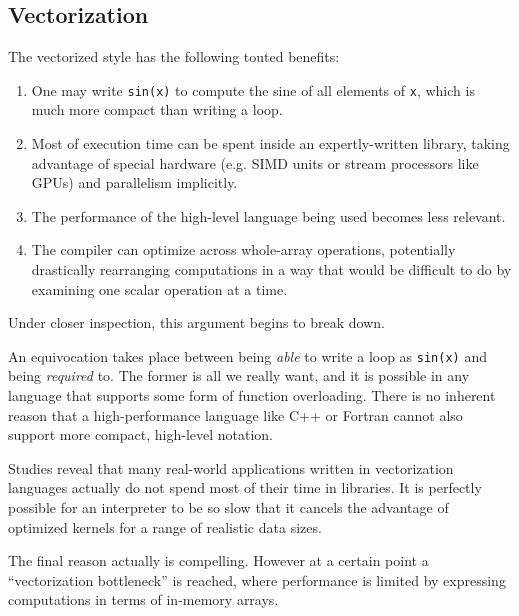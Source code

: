 {%

\subsection{Vectorization}

The vectorized style has the following touted benefits:

\begin{enumerate}
\item One may write \texttt{sin(x)} to compute the sine of
all elements of \texttt{x}, which is much more compact than writing a loop.
\item Most of execution time can be spent inside an expertly-written library,
taking advantage of special hardware (e.g. SIMD units or stream processors
like GPUs) and parallelism implicitly.
\item The performance of the high-level language being used becomes less
relevant.
\item The compiler can optimize across whole-array operations, potentially
drastically rearranging computations in a way that would be difficult to do
by examining one scalar operation at a time.
\end{enumerate}

Under closer inspection, this argument begins to break down.

An equivocation takes place between being \emph{able} to write a loop
as \texttt{sin(x)} and being \emph{required} to.
The former is all we really want, and it is possible in any language that
supports some form of function overloading.
There is no inherent reason that a high-performance language like C++ or
Fortran cannot also support more compact, high-level notation.

Studies reveal that many real-world applications written in vectorization
languages actually do not spend most of their time in libraries. %
\cite{evaluatingR}
It is perfectly possible for an interpreter to be so slow that it cancels
the advantage of optimized kernels for a range of realistic data sizes.

The final reason actually is compelling. However at a certain point a
``vectorization bottleneck'' is reached, where performance is limited by
expressing computations in terms of in-memory arrays.

}
